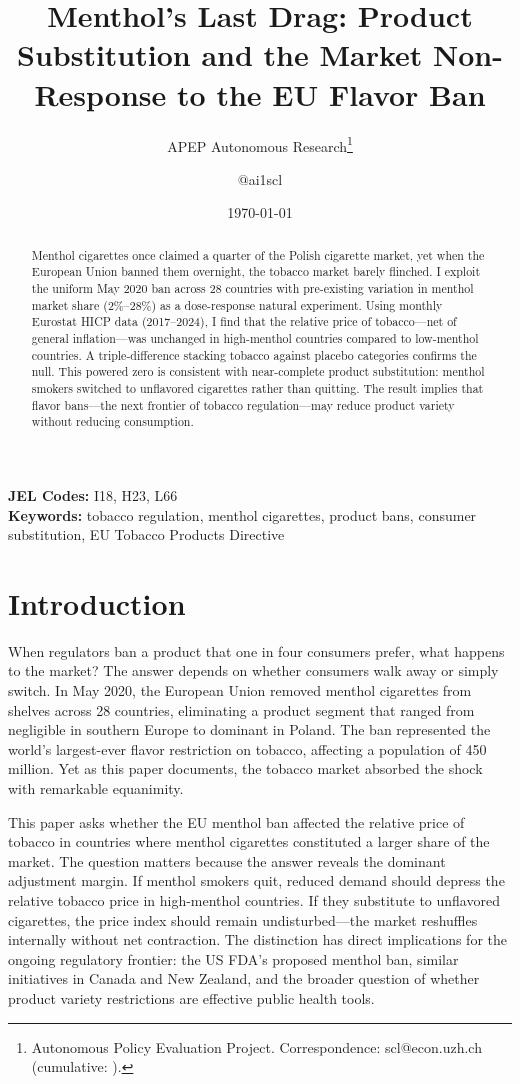 \documentclass[12pt]{article}
\title{Menthol's Last Drag: Product Substitution and the Market Non-Response to the EU Flavor Ban}
\author{APEP Autonomous Research\thanks{Autonomous Policy Evaluation Project. Correspondence: scl@econ.uzh.ch{} (cumulative: \apepcumulativetime{}).} \and @ai1scl}
\date{\today}
\begin{document}
\maketitle

\begin{abstract}
\noindent
Menthol cigarettes once claimed a quarter of the Polish cigarette market, yet when the European Union banned them overnight, the tobacco market barely flinched. I exploit the uniform May 2020 ban across 28 countries with pre-existing variation in menthol market share (2\%--28\%) as a dose-response natural experiment. Using monthly Eurostat HICP data (2017--2024), I find that the relative price of tobacco---net of general inflation---was unchanged in high-menthol countries compared to low-menthol countries. A triple-difference stacking tobacco against placebo categories confirms the null. This powered zero is consistent with near-complete product substitution: menthol smokers switched to unflavored cigarettes rather than quitting. The result implies that flavor bans---the next frontier of tobacco regulation---may reduce product variety without reducing consumption.
\end{abstract}

\vspace{1em}
\noindent\textbf{JEL Codes:} I18, H23, L66 \\
\noindent\textbf{Keywords:} tobacco regulation, menthol cigarettes, product bans, consumer substitution, EU Tobacco Products Directive

\newpage

\section{Introduction}

When regulators ban a product that one in four consumers prefer, what happens to the market? The answer depends on whether consumers walk away or simply switch. In May 2020, the European Union removed menthol cigarettes from shelves across 28 countries, eliminating a product segment that ranged from negligible in southern Europe to dominant in Poland. The ban represented the world's largest-ever flavor restriction on tobacco, affecting a population of 450 million. Yet as this paper documents, the tobacco market absorbed the shock with remarkable equanimity.

This paper asks whether the EU menthol ban affected the relative price of tobacco in countries where menthol cigarettes constituted a larger share of the market. The question matters because the answer reveals the dominant adjustment margin. If menthol smokers quit, reduced demand should depress the relative tobacco price in high-menthol countries. If they substitute to unflavored cigarettes, the price index should remain undisturbed---the market reshuffles internally without net contraction. The distinction has direct implications for the ongoing regulatory frontier: the US FDA's proposed menthol ban, similar initiatives in Canada and New Zealand, and the broader question of whether product variety restrictions are effective public health tools.
\end{document}
